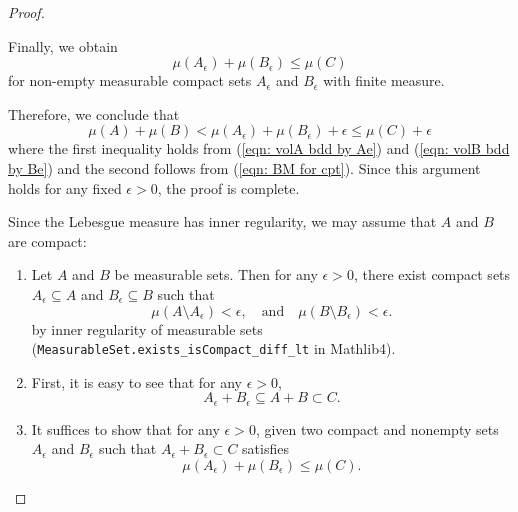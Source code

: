 \begin{proof}
\begin{enumerate}
\begin{enumerate}
            Finally, we obtain
            \begin{equation}
                \mu(A_\epsilon) + \mu(B_\epsilon) \leq \mu(C)
                \label{eqn: BM for cpt}
            \end{equation}
            for non-empty measurable compact sets \(A_\epsilon\) and \(B_\epsilon\) with finite measure.

            Therefore, we conclude that 
            \begin{equation*}
                \mu(A) + \mu(B) < \mu(A_\epsilon) + \mu(B_\epsilon) + \epsilon \leq \mu(C) + \epsilon
            \end{equation*}
            where the first inequality holds from (\ref{eqn: volA bdd by Ae}) and (\ref{eqn: volB bdd by Be}) and the second follows from (\ref{eqn: BM for cpt}).
            Since this argument holds for any fixed \(\epsilon>0\), the proof is complete.

        \end{enumerate}
        
        Since {the Lebesgue measure has inner regularity}, we may assume that \(A\) and \(B\) are compact:

        \begin{enumerate}
            \item Let \(A\) and \(B\) be measurable sets. Then for any \(\epsilon>0\), there exist compact sets \(A_\epsilon \subseteq A\) and \(B_\epsilon \subseteq B\) such that
            \begin{equation}
                \mu(A \setminus A_\epsilon)< \epsilon, \quad \text{and} \quad \mu(B \setminus B_\epsilon) < \epsilon.
                \label{eq: inner regularity}
            \end{equation}
            by inner regularity of measurable sets (\texttt{MeasurableSet.exists\_isCompact\_diff\_lt} in Mathlib4).

            \item First, it is easy to see that for any \(\epsilon>0\),
            \begin{equation*}
                A_\epsilon + B_\epsilon \subseteq A + B \subset C.
            \end{equation*}

            \item It suffices to show that for any \(\epsilon>0\), given two compact and {\color{red}nonempty} sets \(A_\epsilon\) and \(B_\epsilon\) such that
            {\color{red}
            \(A_\epsilon + B_\epsilon \subset C\) satisfies
            \begin{equation}
                \mu(A_\epsilon) + \mu(B_\epsilon) \leq \mu(C).
                \label{eq: STS}
            \end{equation}
            }


\end{enumerate}
\end{enumerate}
\end{proof}
